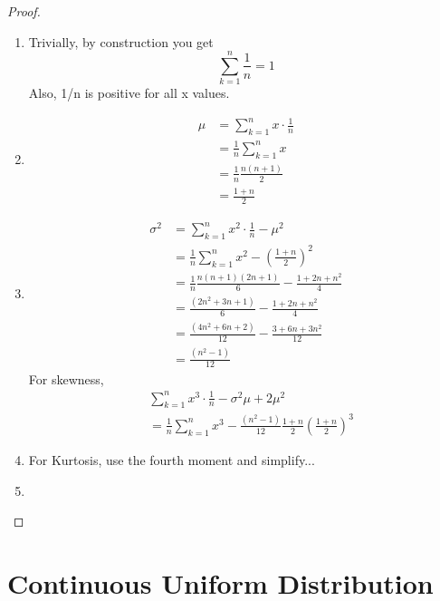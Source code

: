 \documentclass[10pt,]{book}
\theoremstyle{plain}
\theoremstyle{definition}
\theoremstyle{definition}
\theoremstyle{definition}
\numberwithin{equation}{section}
\begin{document}
\begin{proof}\hypertarget{proof-26}{}
\leavevmode%
\begin{enumerate}
\item\hypertarget{li-156}{}Trivially, by construction you get \begin{equation*}\sum_{k=1}^n \frac{1}{n} = 1\end{equation*}
		Also, 1/n is positive for all x values.
\item\hypertarget{li-157}{}\begin{align*}
\mu & = \sum_{k=1}^n x \cdot \frac{1}{n}\\
 & = \frac{1}{n}\sum_{k=1}^n x \\
 & = \frac{1}{n} \frac{n(n+1)}{2}\\
 & = \frac{1+n}{2}
\end{align*}%
\item\hypertarget{li-158}{}\begin{align*}
\sigma^2 & = \sum_{k=1}^n x^2 \cdot \frac{1}{n} - \mu^2\\
 & = \frac{1}{n}\sum_{k=1}^n x^2 - \left ( \frac{1+n}{2}\right )^2 \\
 & = \frac{1}{n} \frac{n(n+1)(2n+1)}{6} - \frac{1+2n+n^2}{4}\\
 & = \frac{(2n^2+3n+1)}{6} - \frac{1+2n+n^2}{4}\\
 & = \frac{(4n^2+6n+2)}{12} - \frac{3+6n+3n^2}{12}\\
 & = \frac{(n^2-1)}{12}
\end{align*}%
For skewness,
		\begin{align*}
& \sum_{k=1}^n x^3 \cdot \frac{1}{n} - \sigma^2 \mu + 2\mu^2\\
 & = \frac{1}{n}\sum_{k=1}^n x^3 - \frac{(n^2-1)}{12} \frac{1+n}{2}\left ( \frac{1+n}{2}\right )^3 
\end{align*}
\item\hypertarget{li-159}{}For Kurtosis, use the fourth moment and simplify...
\item\hypertarget{li-160}{}%
\end{enumerate}
\end{proof}
\typeout{************************************************}
\typeout{************************************************}
\section[Continuous Uniform Distribution]{Continuous Uniform Distribution}\label{section-28}
\end{document}
